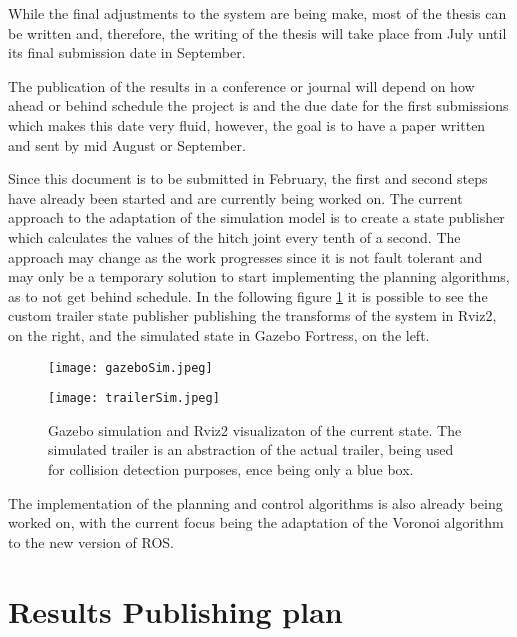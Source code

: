 While the final adjustments to the system are being make, most of the thesis can be written and, therefore, 
the writing of the thesis will take place from July until its final submission date in September. 

The publication of the results in a conference or journal will depend on how ahead or behind schedule the project is and 
the due date for the first submissions which makes this date very fluid, however, the goal is to have a paper written and sent 
by mid August or September. 

Since this document is to be submitted in February, the first and second steps have already been started 
and are currently being worked on. The current approach to the adaptation of the simulation model is to create a 
state publisher which calculates the values of the hitch joint every tenth of a second. The approach may change as the work progresses since it is not fault tolerant and may only be 
a temporary solution to start implementing the planning algorithms, as to not get behind schedule.
In the following figure \ref{fig:publisher} it is possible to see the custom trailer state publisher 
publishing the transforms of the system in Rviz2, on the right, and the simulated state in Gazebo Fortress, on the left.

\begin{figure}[htbp]
    \centering
    \begin{minipage}[b]{0.4\textwidth}
        \centering
        \texttt{[image: gazeboSim.jpeg]}
    \end{minipage}
    \hspace{0.75cm}
    \begin{minipage}[b]{0.4\textwidth}
        \centering
        \texttt{[image: trailerSim.jpeg]} 
    \end{minipage}
    \caption{Gazebo simulation and Rviz2 visualizaton of the current state. The simulated trailer 
    is an abstraction of the actual trailer, being used for collision detection purposes, ence being only a 
    blue box.}
    \label{fig:publisher}
\end{figure}

The implementation of the planning and control algorithms is also already being worked on, with the current focus 
being the adaptation of the Voronoi algorithm to the new version of ROS.
\clearpage
\section{Results Publishing plan}
\label{sec:resultsplan}
